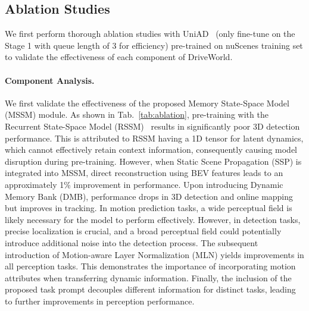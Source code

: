 \subsection{Ablation Studies}
We first perform thorough ablation studies with UniAD~\cite{uniad} (only fine-tune on the Stage 1 with queue length of 3 for efficiency) pre-trained on nuScenes training set to validate the effectiveness of each component of DriveWorld. 
\paragraph{Component Analysis.}
We first validate the effectiveness of the proposed Memory State-Space Model (MSSM) module. As shown in Tab.~\ref{tab:ablation}, pre-training with the Recurrent State-Space Model (RSSM)~\cite{plas_wm} results in significantly poor 3D detection performance. This is attributed to RSSM having a 1D tensor for latent dynamics, which cannot effectively retain context information, consequently causing model disruption during pre-training. However, when Static Scene Propagation (SSP) is integrated into MSSM, direct reconstruction using BEV features leads to an approximately 1\% improvement in performance. Upon introducing Dynamic Memory Bank (DMB), performance drops in 3D detection and online mapping but improves in tracking. In motion prediction tasks, a wide perceptual field is likely necessary for the model to perform effectively. However, in detection tasks, precise localization is crucial, and a broad perceptual field could potentially introduce additional noise into the detection process. The subsequent introduction of Motion-aware Layer Normalization (MLN) yields improvements in all perception tasks. This demonstrates the importance of incorporating motion attributes when transferring dynamic information. Finally, the inclusion of the proposed task prompt decouples different information for distinct tasks, leading to further improvements in perception performance. 
